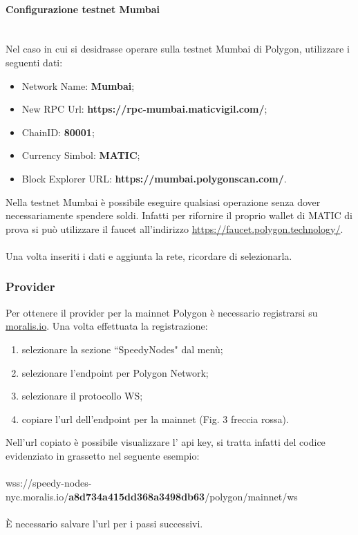 \documentclass[a4paper, 12pt]{article}
\begin{document}
\paragraph{Configurazione testnet Mumbai}\\
Nel caso in cui si desidrasse operare sulla testnet Mumbai di Polygon, utilizzare i seguenti dati:
\begin{itemize}
\item Network Name: \textbf{Mumbai};
\item New RPC Url: \textbf{https://rpc-mumbai.maticvigil.com/};
\item ChainID: \textbf{80001};
\item Currency Simbol: \textbf{MATIC};
\item Block Explorer URL: \textbf{https://mumbai.polygonscan.com/}.
\end{itemize}
Nella testnet Mumbai è possibile eseguire qualsiasi operazione senza dover necessariamente spendere soldi. Infatti per rifornire il proprio wallet di MATIC di prova si può utilizzare il faucet all'indirizzo \url{https://faucet.polygon.technology/}.\\ \\
Una volta inseriti i dati e aggiunta la rete, ricordare di selezionarla.
\subsubsection{Provider}
\label{sec:provider}
Per ottenere il provider per la mainnet Polygon è necessario registrarsi su \href{https://www.moralis.io}{moralis.io}. Una volta effettuata la registrazione:
\begin{enumerate}
  \item selezionare la sezione ``SpeedyNodes" dal menù;
  \item selezionare l'endpoint per Polygon Network;
  \item selezionare il protocollo WS;
  \item copiare l'url dell'endpoint per la mainnet (Fig. 3 freccia rossa).
\end{enumerate}
Nell'url copiato è possibile visualizzare l' api key, si tratta infatti del codice evidenziato in grassetto nel seguente esempio:\\\\
wss://speedy-nodes-nyc.moralis.io/\textbf{a8d734a415dd368a3498db63}/polygon/mainnet/ws\\\\
È necessario salvare l'url per i passi successivi.
\end{document}
